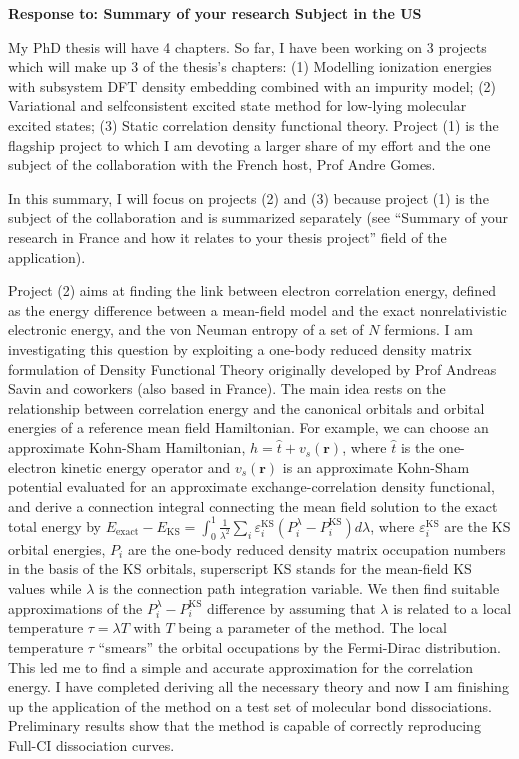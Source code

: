\documentclass[notitlepage,12pt]{report}
\def\br{{\mathbf{r}}}
\begin{document}
\thispagestyle{empty}
\begin{center}
    \textbf{Response to: Summary of your research Subject in the US}
\end{center}

My PhD thesis will have 4 chapters. So far, I have been working on 3 projects which will make up 3 of the thesis's chapters: (1) Modelling ionization energies with subsystem DFT density embedding combined with an impurity model; (2) Variational and selfconsistent excited state method for low-lying molecular excited states; (3) Static correlation density functional theory. Project (1) is the flagship project to which I am devoting a larger share of my effort and the one subject of the collaboration with the French host, Prof Andre Gomes.

In this summary, I will focus on projects (2) and (3) because project (1) is the subject of the collaboration and is summarized separately (see ``Summary of your research in France and how it relates to your thesis project'' field of the application).

Project (2) aims at finding the link between electron correlation energy, defined as the energy difference between a mean-field model and the exact nonrelativistic electronic energy, and the von Neuman entropy of a set of $N$ fermions. I am investigating this question by exploiting a one-body reduced density matrix formulation of Density Functional Theory originally developed by Prof Andreas Savin and coworkers (also based in France). The main idea rests on the relationship between correlation energy and the canonical orbitals and orbital energies of a reference mean field Hamiltonian. For example, we can choose an approximate Kohn-Sham Hamiltonian, $\hat h = \hat t + v_s(\br)$, where $\hat t$ is the one-electron kinetic energy operator and $v_s(\br)$ is an approximate Kohn-Sham potential evaluated for an approximate exchange-correlation density functional, and derive a connection integral connecting the mean field solution to the exact total energy by $E_\text{exact}-E_\text{KS} = \int_0^1 \frac{1}{\lambda^2} \sum_i \varepsilon_i^\text{KS} \left( P_i^\lambda - P_i^\text{KS} \right)  d\lambda$, where $\varepsilon_i^\text{KS}$ are the KS orbital energies, $P_i$ are the one-body reduced density matrix occupation numbers in the basis of the KS orbitals, superscript KS stands for the mean-field KS values while $\lambda$ is the connection path integration variable. We then find suitable approximations of the $P_i^\lambda - P_i^\text{KS}$ difference by assuming that $\lambda$ is related to a local temperature $\tau=\lambda T$ with $T$ being a parameter of the method. The local temperature $\tau$ ``smears'' the orbital occupations by the Fermi-Dirac distribution. This led me to find a simple and accurate approximation for the correlation energy. I have completed deriving all the necessary theory and now I am finishing up the application of the method on a test set of molecular bond dissociations. Preliminary results show that the method is capable of correctly reproducing Full-CI dissociation curves.
\end{document}
